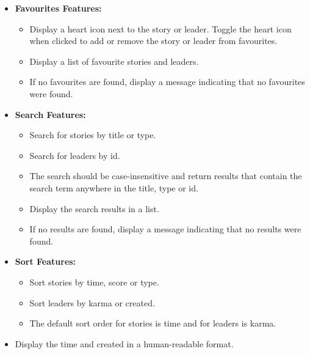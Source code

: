 \documentclass{article}
\begin{document}
\begin{itemize}
\begin{itemize}
			\item \textbf{Favourites Features:}
			\begin{itemize}
				\item Display a heart icon next to the story or leader. Toggle the heart icon when clicked to add or remove the story or leader from favourites. 
				\item Display a list of favourite stories and leaders. 
				\item If no favourites are found, display a message indicating that no favourites were found.
			\end{itemize}
			
			\item \textbf{Search Features:}
			\begin{itemize}
				\item Search for stories by title or type.
				\item Search for leaders by id.
				\item The search should be case-insensitive and return results that contain the search term anywhere in the title, type or id.
				\item Display the search results in a list. 
				\item If no results are found, display a message indicating that no results were found.
			\end{itemize}

			\item \textbf{Sort Features:}
			\begin{itemize}
				\item Sort stories by time, score or type. 
				\item Sort leaders by karma or created. 
				\item The default sort order for stories is time and for leaders is karma.
			\end{itemize}

			\item Display the time and created in a human-readable format. 


\end{itemize}
\end{itemize}
\end{document}
